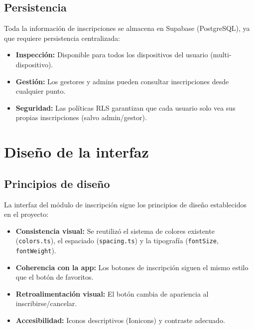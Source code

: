 \documentclass[12pt,letterpaper]{article}
\begin{document}
\subsection{Persistencia}

Toda la informaci\'on de inscripciones se almacena en Supabase
(PostgreSQL), ya que requiere persistencia centralizada:
\begin{itemize}
  \item \textbf{Inspecci\'on:} Disponible para todos los dispositivos
    del usuario (multi-dispositivo).
  \item \textbf{Gesti\'on:} Los gestores y admins pueden consultar
    inscripciones desde cualquier punto.
  \item \textbf{Seguridad:} Las pol\'iticas RLS garantizan que cada
    usuario solo vea sus propias inscripciones (salvo admin/gestor).
\end{itemize}

\section{Dise\~no de la interfaz}

\subsection{Principios de dise\~no}

La interfaz del m\'odulo de inscripci\'on sigue los principios de
dise\~no establecidos en el proyecto:

\begin{itemize}
  \item \textbf{Consistencia visual:} Se reutiliz\'o el sistema de
    colores existente (\texttt{colors.ts}), el espaciado
    (\texttt{spacing.ts}) y la tipograf\'ia (\texttt{fontSize},
    \texttt{fontWeight}).
  \item \textbf{Coherencia con la app:} Los botones de inscripci\'on
    siguen el mismo estilo que el bot\'on de favoritos.
  \item \textbf{Retroalimentaci\'on visual:} El bot\'on cambia de
    apariencia al inscribirse/cancelar.
  \item \textbf{Accesibilidad:} Iconos descriptivos (Ionicons) y
    contraste adecuado.
\end{itemize}
\end{document}
